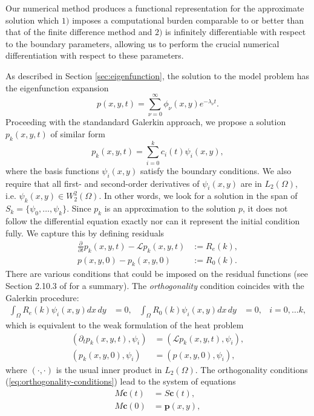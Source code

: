 \documentclass[10pt]{article}
\begin{document}
Our numerical method produces a functional representation for the
approximate solution which $1)$ imposes a computational burden
comparable to or better than that of the finite difference method and
$2)$ is infinitely differentiable with respect to the boundary
parameters, allowing us to perform the crucial numerical
differentiation with respect to these parameters.

As described in Section \ref{sec:eigenfunction}, the solution to the
model problem has the eigenfunction expansion 
\[
  p(x,y,t) = \sum_{\nu=0}^\infty\phi_\nu(x,y) e^{-\lambda_\nu t}.
\]
Proceeding with the standandard Galerkin approach, we propose a
solution $p_{k}(x,y,t)$ of similar form
\[
  p_{k}(x,y,t) = \sum_{i=0}^k c_i(t) \psi_i(x,y),
\]
where the basis functions $\psi_i(x,y)$ satisfy the boundary
conditions. We also require that all first- and second-order
derivatives of $\psi_i(x,y)$ are in $L_2(\Omega)$, i.e.
$\psi_k(x,y) \in W_{2}^{2}(\Omega)$. In other words, we look for a
solution in the span of $S_k = \{\psi_0, \ldots, \psi_k\}$. Since
$p_k$ is an approximation to the solution $p$, it does not follow the
differential equation exactly nor can it represent the initial
condition fully. We capture this by defining residuals
\begin{align*}
  \frac{\partial}{\partial t} p_k(x,y,t) - \mathcal{L}p_k(x,y,t) &:= R_e(k), \\
  p(x,y,0) - p_k(x,y,0) &:= R_0(k).
\end{align*}
There are various conditions that could be imposed on the residual
functions (see Section 2.10.3 of \cite{norrie1973finite} for a
summary). The \textit{orthogonality} condition coincides with the
Galerkin procedure:
\begin{align}
  \displaystyle \int_{\Omega} R_e(k) \psi_i(x,y) dx\,dy &= 0,& \displaystyle \int_{\Omega} R_0(k) \psi_i(x,y) dx\,dy &= 0,& i = 0,\ldots k, \label{eq:orthogonality-conditions}
\end{align}
which is equivalent to the weak formulation of the heat problem
\begin{align*}
  \left( \partial_t p_k(x,y,t), \psi_i \right) &= \left(\mathcal{L}p_k(x,y,t), \psi_i \right), \\
  \left( p_k(x,y,0), \psi_i \right) &= \left(p(x,y,0), \psi_i\right),
\end{align*}
where $(\cdot, \cdot)$ is the usual inner product in
$L_2(\Omega)$. The orthogonality conditions
(\ref{eq:orthogonality-conditions}) lead to the system of equations
\begin{align*}
  M \mathbf{\dot{c}}(t) &= S \mathbf{c}(t), \\
  M \mathbf{c}(0) &= \mathbf{p}(x,y),
\end{align*}
\end{document}
